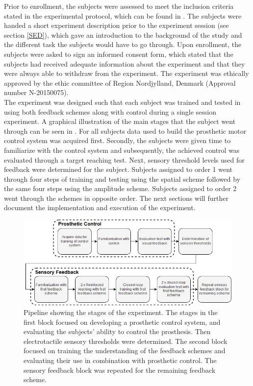 \vspace{-0.4cm}
Prior to enrollment, the subjects were assessed to meet the inclusion criteria stated in the experimental protocol, which can be found in . The subjects were handed a short experiment description prior to the experiment session (see section \ref{SED}), which gave an introduction to the background of the study and the different task the subjects would have to go through. Upon enrollment, the subjects were asked to sign an informed consent form, which stated that the subjects had received adequate information about the experiment and that they were always able to withdraw from the experiment. The experiment was ethically approved by the ethic committee of Region Nordjylland, Denmark (Approval number N-20150075).\\
The experiment was designed such that each subject was trained and tested in using both feedback schemes along with control during a single session experiment. A graphical illustration of the main stages that the subject went through can be seen in . For all subjects data used to build the prosthetic motor control system was acquired first. Secondly, the subjects were given time to familiarize with the control system and subsequently, the achieved control was evaluated through a target reaching test. Next, sensory threshold levels used for feedback were determined for the subject. Subjects assigned to order 1 went through four steps of training and testing using the spatial scheme followed by the same four steps using the amplitude scheme. Subjects assigned to order 2 went through the schemes in opposite order. The next sections will further document the implementation and execution of the experiment.     

\begin{figure}[H]                 
	\includegraphics[width=.95\textwidth]{figures/std_paper}
	\caption{Pipeline showing the stages of the experiment. The stages in the first block focused on developing a prosthetic control system, and evaluating the
		subjects’ ability to control the prosthesis. Then electrotactile sensory thresholds were determined. The second block focused on training the understanding of
		the feedback schemes and evaluating their use in combination with prosthetic control. The sensory feedback block was repeated for the remaining feedback
		scheme.}
	\label{fig:std} 
\end{figure}